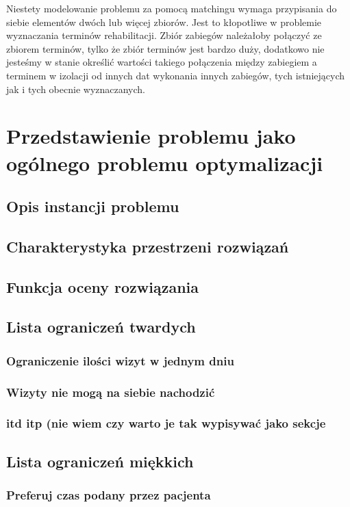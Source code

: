 Niestety modelowanie problemu za pomocą matchingu wymaga przypisania do
siebie elementów dwóch lub więcej zbiorów. Jest to kłopotliwe w problemie wyznaczania
terminów rehabilitacji. Zbiór zabiegów należałoby połączyć ze zbiorem
terminów, tylko że zbiór terminów jest bardzo duży, dodatkowo nie jesteśmy w
stanie określić wartości takiego połączenia między zabiegiem a terminem w
izolacji od innych dat wykonania innych zabiegów, tych istniejących jak i tych
obecnie wyznaczanych.

\chapter{Przedstawienie problemu jako ogólnego problemu optymalizacji}
\section{Opis instancji problemu}
\section{Charakterystyka przestrzeni rozwiązań}
\section{Funkcja oceny rozwiązania}
\section{Lista ograniczeń twardych \label{constraints}}
\subsection{Ograniczenie ilości wizyt w jednym dniu}
\subsection{Wizyty nie mogą na siebie nachodzić}
\subsection{itd itp (nie wiem czy warto je tak wypisywać jako sekcje}
\section{Lista ograniczeń miękkich}
\subsection{Preferuj czas podany przez pacjenta}
